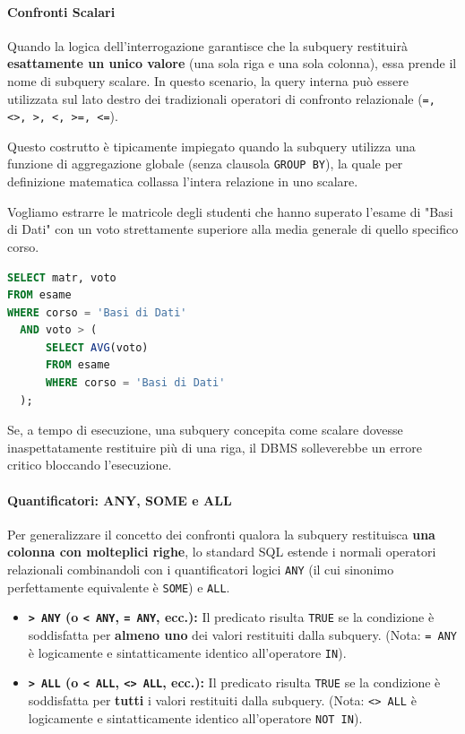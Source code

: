 \paragraph{Confronti Scalari}

Quando la logica dell'interrogazione garantisce che la subquery restituirà \textbf{esattamente un unico valore} (una sola riga e una sola colonna), essa prende il nome di subquery scalare. In questo scenario, la query interna può essere utilizzata sul lato destro dei tradizionali operatori di confronto relazionale (\texttt{=, <>, >, <, >=, <=}).

Questo costrutto è tipicamente impiegato quando la subquery utilizza una funzione di aggregazione globale (senza clausola \texttt{GROUP BY}), la quale per definizione matematica collassa l'intera relazione in uno scalare.

\begin{example}
Vogliamo estrarre le matricole degli studenti che hanno superato l'esame di "Basi di Dati" con un voto strettamente superiore alla media generale di quello specifico corso.
\begin{lstlisting}[language=SQL, basicstyle=\ttfamily\small, keywordstyle=\color{blue}\bfseries]
SELECT matr, voto
FROM esame
WHERE corso = 'Basi di Dati' 
  AND voto > (
      SELECT AVG(voto)
      FROM esame
      WHERE corso = 'Basi di Dati'
  );
\end{lstlisting}
Se, a tempo di esecuzione, una subquery concepita come scalare dovesse inaspettatamente restituire più di una riga, il DBMS solleverebbe un errore critico bloccando l'esecuzione.
\end{example}

\paragraph{Quantificatori: ANY, SOME e ALL}

Per generalizzare il concetto dei confronti qualora la subquery restituisca \textbf{una colonna con molteplici righe}, lo standard SQL estende i normali operatori relazionali combinandoli con i quantificatori logici \texttt{ANY} (il cui sinonimo perfettamente equivalente è \texttt{SOME}) e \texttt{ALL}.

\begin{itemize}
    \item \textbf{\texttt{> ANY} (o \texttt{< ANY}, \texttt{= ANY}, ecc.):} Il predicato risulta \texttt{TRUE} se la condizione è soddisfatta per \textbf{almeno uno} dei valori restituiti dalla subquery. (Nota: \texttt{= ANY} è logicamente e sintatticamente identico all'operatore \texttt{IN}).
    \item \textbf{\texttt{> ALL} (o \texttt{< ALL}, \texttt{<> ALL}, ecc.):} Il predicato risulta \texttt{TRUE} se la condizione è soddisfatta per \textbf{tutti} i valori restituiti dalla subquery. (Nota: \texttt{<> ALL} è logicamente e sintatticamente identico all'operatore \texttt{NOT IN}).
\end{itemize}

